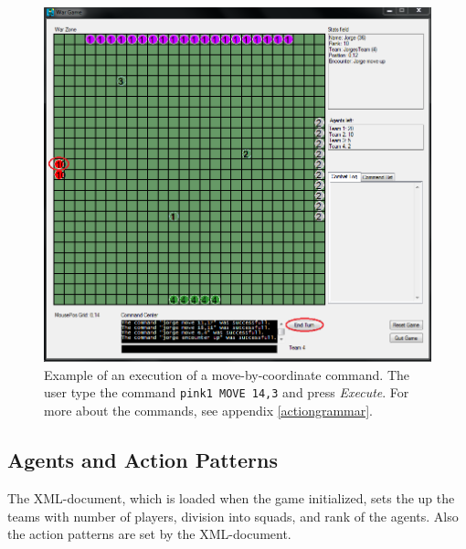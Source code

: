 \begin{figure}[H]
\begin{center}
\includegraphics[scale=0.6]{Images/ex_com.png}
\end{center}
\caption{Example of an execution of a move-by-coordinate command. The user type the command \texttt{pink1 MOVE 14,3} and press \textit{Execute}. For more about the commands, see appendix \ref{actiongrammar}.}
\label{fig:ex_com}
\end{figure}

\subsection{Agents and Action Patterns}
\label{agents_patterns}

The XML-document, which is loaded when the game initialized, sets the up the teams with number of players, division into squads, and rank of the agents. Also the action patterns are set by the XML-document.